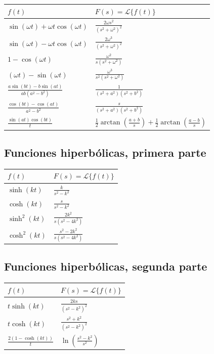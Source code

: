 \documentclass[11pt,a4paper,openany]{book}
\begin{document}
\begin{center}
	\renewcommand{\arraystretch}{1.8}
	\begin{tabular}{ll}
		\textbf{$f(t)$} & \textbf{$F(s) = \mathcal{L}\{f(t)\}$} \\ \hline
		$\sin(\omega t) + \omega t\cos(\omega t)$ & $\frac{2\omega s^{2}}{(s^{2}+\omega ^{2})^{2}}$ \\ 
		$\sin(\omega t) - \omega t\cos(\omega t)$ & $\frac{2\omega ^{3}}{(s^{2}+\omega ^{2})^{2}}$ \\ 
		$1-\cos(\omega t)$ & $\frac{\omega ^{2}}{s(s^{2}+\omega^{2})}$ \\ 
		$(\omega t) - \sin(\omega t)$ & $\frac{\omega ^{3}}{s^{2}(s^{2}+\omega ^{2})}$ \\ 
		$\frac{a\sin(bt) - b\sin(at)}{ab(a^{2}-b^{2})}$ & $\frac{1}{(s^{2}+a^{2})(s^{2}+b^{2})}$ \\ 
		$\frac{\cos(bt) - \cos(at)}{a^{2}-b^{2}}$ & $\frac{s}{(s^{2}+a^{2})(s^{2}+b^{2})}$ \\ 
		$\frac{\sin(at)\cos(bt)}{t}$ & $\frac{1}{2}\arctan \left(\frac{a+b}{s}\right) + \frac{1}{2}\arctan \left(\frac{a-b}{s}\right)$ \\ 
	\end{tabular}
\end{center}

\subsection{Funciones hiperb\'{o}licas, primera parte}

\begin{center}
	\renewcommand{\arraystretch}{1.8}
	\begin{tabular}{ll}
		\textbf{$f(t)$} & \textbf{$F(s) = \mathcal{L}\{f(t)\}$} \\ \hline
		$\sinh(kt)$ & $\frac{k}{s^{2}-k^{2}}$ \\ 
		$\cosh(kt)$ & $\frac{s}{s^{2}-k^{2}}$ \\ 
		$\sinh^{2}(kt)$ & $\frac{2k^{2}}{s(s^{2}-4k^{2})}$ \\ 
		$\cosh^{2}(kt)$ & $\frac{s^{2}-2k^{2}}{s(s^{2}-4k^{2})}$
	\end{tabular}
\end{center}

\subsection{Funciones hiperb\'{o}licas, segunda parte}

\begin{center}
	\renewcommand{\arraystretch}{1.8}
	\begin{tabular}{ll}
		\textbf{$f(t)$} & \textbf{$F(s) = \mathcal{L}\{f(t)\}$} \\ \hline
		$t\sinh(kt)$ & $\frac{2ks}{(s^{2}-k^{2})^{2}}$ \\ 
		$t\cosh(kt)$ & $\frac{s^{2}+k^{2}}{(s^{2}-k^{2})^{2}}$ \\ 
		$\frac{2(1-\cosh(kt))}{t}$ & $\ln \left( \frac{s^{2}-k^{2}}{s^{2}} \right)$ \\ 
	\end{tabular}
\end{center}
\end{document}
